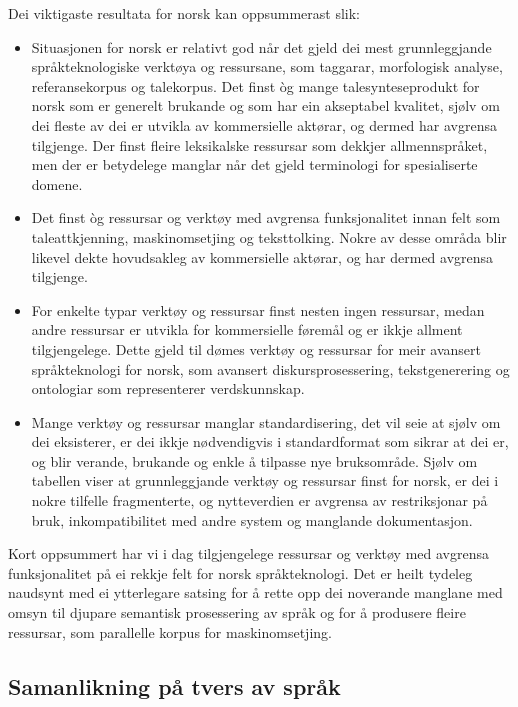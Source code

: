 \begin{multicols}{2}
Dei viktigaste resultata for norsk kan oppsummerast slik: 

\begin{itemize}
\item Situasjonen for norsk er relativt god når det gjeld dei mest grunnleggjande språkteknologiske verktøya og ressursane, som taggarar, morfologisk analyse, referansekorpus og talekorpus.
Det finst òg mange talesynteseprodukt for norsk som er generelt brukande og som har ein akseptabel kvalitet, sjølv om dei fleste av dei er utvikla av kommersielle aktørar, og dermed har avgrensa tilgjenge. Der finst fleire leksikalske ressursar som dekkjer allmennspråket, men der er betydelege manglar når det gjeld terminologi for spesialiserte domene.
\item Det finst òg ressursar og verktøy med avgrensa funksjonalitet innan felt som taleattkjenning, maskinomsetjing og teksttolking. Nokre av desse områda blir likevel dekte hovudsakleg av kommersielle aktørar, og har dermed avgrensa tilgjenge.
\item For enkelte typar verktøy og ressursar finst nesten ingen ressursar, medan andre ressursar er utvikla for kommersielle føremål og er ikkje allment tilgjengelege. 
Dette gjeld til dømes verktøy og ressursar for meir avansert språkteknologi for norsk, som avansert diskursprosessering, tekstgenerering og ontologiar som representerer verdskunnskap.
\item Mange verktøy og ressursar manglar standardisering, det vil seie at sjølv om dei eksisterer, er dei ikkje nødvendigvis i standardformat som sikrar at dei er, og blir verande, brukande og enkle å tilpasse nye bruksområde.
Sjølv om tabellen viser at grunnleggjande verktøy og ressursar finst for norsk, er dei i nokre tilfelle fragmenterte, og nytteverdien er avgrensa av restriksjonar på bruk, inkompatibilitet med andre system og manglande dokumentasjon. 
\end{itemize}

Kort oppsummert har vi i dag tilgjengelege ressursar og verktøy med avgrensa funksjonalitet på ei rekkje felt for norsk språkteknologi.
Det er heilt tydeleg naudsynt med ei ytterlegare satsing for å rette opp dei noverande manglane med omsyn til djupare semantisk prosessering av språk og for å produsere fleire ressursar, som parallelle korpus for maskinomsetjing.

\subsection{Samanlikning på tvers av språk}


\end{multicols}
